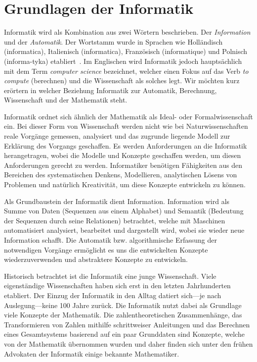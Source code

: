 \chapter{Grundlagen der Informatik}
%
Informatik wird als Kombination aus zwei Wörtern beschrieben. Der
\emph{Information} und der \emph{Automatik}. Der Wortstamm wurde in
Sprachen wie Holländisch (informatica), Italienisch (informatica),
Französisch (informatique) und Polnisch (informa-tyka)
etabliert~\cite[p. 21]{Balzert04}.
Im Englischen wird Informatik
jedoch hauptsächlich mit dem Term \emph{computer science} bezeichnet,
welcher einen Fokus auf das Verb \emph{to compute} (berechnen) und
die Wissenschaft als solches legt. Wir möchten kurz erörtern in
welcher Beziehung Informatik zur Automatik, Berechnung, Wissenschaft
und der Mathematik steht.

Informatik ordnet sich ähnlich der Mathematik als Ideal- oder
Formalwissenschaft ein. Bei dieser Form von Wissenschaft werden nicht
wie bei Naturwissenschaften reale Vorgänge gemessen, analysiert und das
zugrunde liegende Modell zur Erklärung des Vorgangs geschaffen. Es werden
Anforderungen an die Informatik herangetragen, wobei die Modelle und
Konzepte geschaffen werden, um diesen Anforderungen gerecht zu werden.
Informatiker benötigen Fähigkeiten aus den Bereichen des systematischen
Denkens, Modellieren, analytischen Lösens von Problemen und natürlich
Kreativität, um diese Konzepte entwickeln zu können.

Als Grundbaustein der Informatik dient Information. Information
wird als Summe von Daten (Sequenzen aus einem Alphabet) und Semantik
(Bedeutung der Sequenzen durch seine Relationen) betrachtet, welche mit
Maschinen automatisiert analysiert, bearbeitet und dargestellt wird,
wobei sie wieder neue Information schafft. Die Automatik bzw. algorithmische
Erfassung der notwendigen Vorgänge ermöglicht es uns die entwickelten
Konzepte wiederzuverwenden und abstraktere Konzepte zu entwickeln.

Historisch betrachtet ist die Informatik eine junge Wissenschaft. Viele
eigenständige Wissenschaften haben sich erst in den letzten Jahrhunderten
etabliert. Der Einzug der Informatik in den Alltag datiert sich---je nach
Auslegung---keine 100 Jahre zurück. Die Informatik nutzt dabei als
Grundlage viele Konzepte der Mathematik. Die zahlentheoretischen
Zusammenhänge, das Transformieren von Zahlen mithilfe schrittweiser
Anleitungen und das Berechnen eines Gesamtsystems basierend auf ein paar
Grunddaten sind Konzepte, welche von der Mathematik übernommen wurden
und daher finden sich unter den frühen Advokaten der Informatik
einige bekannte Mathematiker.

